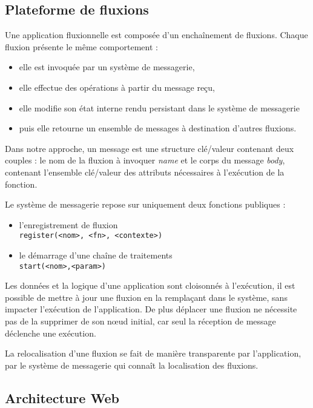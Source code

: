 
\subsection{Plateforme de fluxions}

Une application fluxionnelle est composée d'un enchaînement de fluxions.
Chaque fluxion présente le même comportement :
\begin{itemize}
  \item elle est invoquée par un système de messagerie,
  \item elle effectue des opérations à partir du message reçu,
  \item elle modifie son état interne rendu persistant dans le système de messagerie
  \item puis elle retourne un ensemble de messages à destination d'autres fluxions.
\end{itemize}

Dans notre approche, un message est une structure clé/valeur contenant deux couples : le nom de la fluxion à invoquer \textit{name} et le corps du message \textit{body}, contenant l'ensemble clé/valeur des attributs nécessaires à l'exécution de la fonction.

Le système de messagerie repose sur uniquement deux fonctions publiques :
\begin{itemize}
  \item l'enregistrement de fluxion\\
    \texttt{register(<nom>, <fn>, <contexte>)}
  \item le démarrage d'une chaîne de traitements\\
    \texttt{start(<nom>,<param>)}
\end{itemize}

Les données et la logique d'une application sont cloisonnés à l'exécution, il est possible de mettre à jour une fluxion en la remplaçant dans le système, sans impacter l'exécution de l'application. De plus déplacer une fluxion ne nécessite pas de la supprimer de son nœud initial, car seul la réception de message déclenche une exécution. 

La relocalisation d'une fluxion se fait de manière transparente par l'application, par le système de messagerie qui connaît la localisation des fluxions. 

\subsection{Architecture Web}


